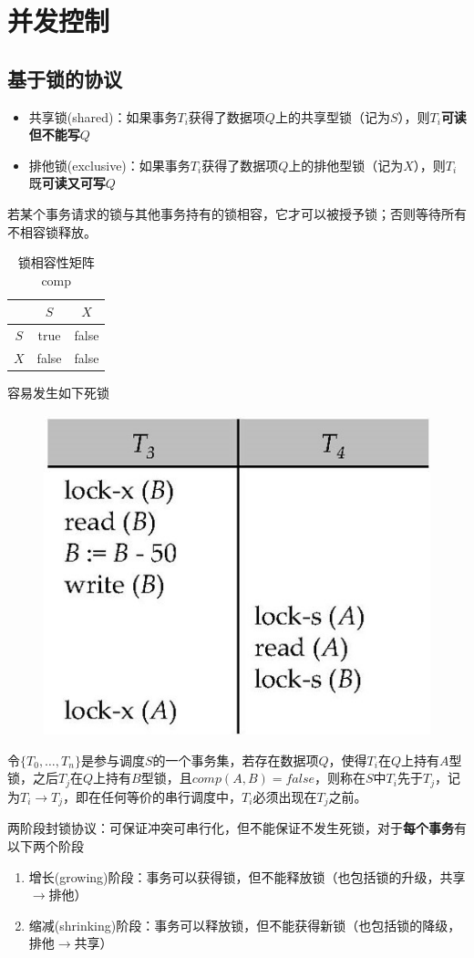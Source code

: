 
\section{并发控制} %
\subsection{基于锁的协议}
\begin{itemize}
	\item 共享锁(shared)：如果事务$T_i$获得了数据项$Q$上的共享型锁（记为$S$），则$T_i$\textbf{可读但不能写}$Q$
	\item 排他锁(exclusive)：如果事务$T_i$获得了数据项$Q$上的排他型锁（记为$X$），则$T_i$既\textbf{可读又可写}$Q$
\end{itemize}

若某个事务请求的锁与其他事务持有的锁相容，它才可以被授予锁；否则等待所有不相容锁释放。
\begin{table}
\centering
\caption{锁相容性矩阵comp}
\begin{tabular}{|c|c|c|}\hline
 & $S$ & $X$\\\hline
$S$ & true & false\\\hline
$X$ & false & false\\\hline
\end{tabular}
\end{table}

容易发生如下死锁
\begin{figure}[H]
\centering
\includegraphics[width=0.3\linewidth]{fig/deadlock.jpg}
\end{figure}

令$\{T_0,\ldots,T_n\}$是参与调度$S$的一个事务集，若存在数据项$Q$，使得$T_i$在$Q$上持有$A$型锁，之后$T_j$在$Q$上持有$B$型锁，且$comp(A,B)=false$，则称在$S$中$T_i$先于$T_j$，记为$T_i\to T_j$，即在任何等价的串行调度中，$T_i$必须出现在$T_j$之前。

两阶段封锁协议：可保证冲突可串行化，但不能保证不发生死锁，对于\textbf{每个事务}有以下两个阶段
\begin{enumerate}
	\item 增长(growing)阶段：事务可以获得锁，但不能释放锁（也包括锁的升级，共享$\to$排他）
	\item 缩减(shrinking)阶段：事务可以释放锁，但不能获得新锁（也包括锁的降级，排他$\to$共享）
\end{enumerate}

